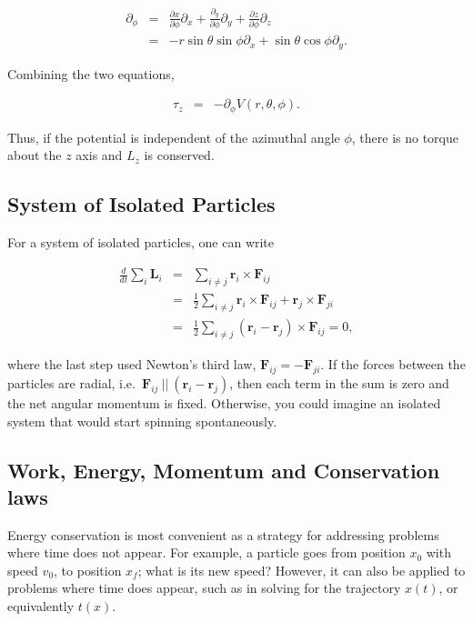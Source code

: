 \documentclass[%
oneside,                 %
final,                   %
10pt]{article}
\begin{document}
\begin{eqnarray}
\partial_\phi&=&\frac{\partial x}{\partial\phi}\partial_x+\frac{\partial_y}{\partial\phi}\partial_y
+\frac{\partial z}{\partial\phi}\partial_z\\
\nonumber
&=&-r\sin\theta\sin\phi\partial_x+\sin\theta\cos\phi\partial_y.
\end{eqnarray}

Combining the two equations,

\begin{eqnarray}
\tau_z&=&-\partial_\phi V(r,\theta,\phi).
\end{eqnarray}

Thus, if the potential is independent of the azimuthal angle $\phi$,
there is no torque about the $z$ axis and $L_z$ is conserved.

\subsection{System of Isolated Particles}

For a system of isolated particles, one can write

\begin{eqnarray}
\frac{d}{dt}\sum_i\bm{L}_i&=&\sum_{i\ne j}\bm{r}_i\times \bm{F}_{ij}\\
\nonumber
&=&\frac{1}{2}\sum_{i\ne j} \bm{r}_i\times \bm{F}_{ij}+\bm{r}_j\times\bm{F}_{ji}\\
\nonumber
&=&\frac{1}{2}\sum_{i\ne j} (\bm{r}_i-\bm{r}_j)\times\bm{F}_{ij}=0,
\end{eqnarray}

where the last step used Newton's third law,
$\bm{F}_{ij}=-\bm{F}_{ji}$. If the forces between the particles are
radial, i.e.~$\bm{F}_{ij} ~||~ (\bm{r}_i-\bm{r}_j)$, then each term in
the sum is zero and the net angular momentum is fixed. Otherwise, you
could imagine an isolated system that would start spinning
spontaneously.

\subsection{Work, Energy, Momentum and Conservation laws}

Energy conservation is most convenient as a strategy for addressing
problems where time does not appear. For example, a particle goes
from position $x_0$ with speed $v_0$, to position $x_f$; what is its
new speed? However, it can also be applied to problems where time
does appear, such as in solving for the trajectory $x(t)$, or
equivalently $t(x)$.
\end{document}
